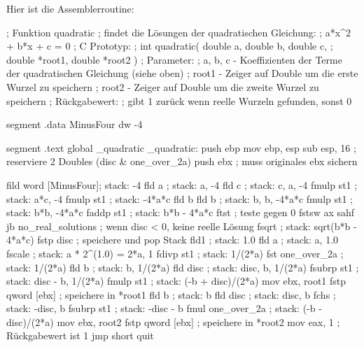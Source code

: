 Hier ist die Assemblerroutine:
\begin{AsmCodeListing}[label=quad.asm, numbers=left, commentchar=$, commandchars=\\\{\}]
 ; Funktion quadratic
 ; findet die L\"{o}sungen der quadratischen Gleichung:
 ;       a*x^2 + b*x + c = 0
 ; C Prototyp:
 ;   int quadratic( double a, double b, double c,
 ;                  double *root1, double *root2 )
 ; Parameter:
 ;   a, b, c - Koeffizienten der Terme der quadratischen Gleichung (siehe oben)
 ;   root1   - Zeiger auf Double um die erste Wurzel zu speichern
 ;   root2   - Zeiger auf Double um die zweite Wurzel zu speichern
 ; R\"{u}ckgabewert:
 ;   gibt 1 zur\"{u}ck wenn reelle Wurzeln gefunden, sonst 0


 segment .data
 MinusFour       dw      -4

 segment .text
         global  _quadratic
 _quadratic:
         push    ebp
         mov     ebp, esp
         sub     esp, 16         ; reserviere 2 Doubles (disc & one_over_2a)
         push    ebx             ; muss originales ebx sichern

         fild    word [MinusFour]; stack: -4
         fld     a               ; stack: a, -4
         fld     c               ; stack: c, a, -4
         fmulp   st1             ; stack: a*c, -4
         fmulp   st1             ; stack: -4*a*c
         fld     b
         fld     b               ; stack: b, b, -4*a*c
         fmulp   st1             ; stack: b*b, -4*a*c
         faddp   st1             ; stack: b*b - 4*a*c
         ftst                    ; teste gegen 0
         fstsw   ax
         sahf
         jb      no_real_solutions ; wenn disc < 0, keine reelle L\"{o}sung
         fsqrt                   ; stack: sqrt(b*b - 4*a*c)
         fstp    disc            ; speichere und pop Stack
         fld1                    ; stack: 1.0
         fld     a               ; stack: a, 1.0
         fscale                  ; stack: a * 2^(1.0) = 2*a, 1
         fdivp   st1             ; stack: 1/(2*a)
         fst     one_over_2a     ; stack: 1/(2*a)
         fld     b               ; stack: b, 1/(2*a)
         fld     disc            ; stack: disc, b, 1/(2*a)
         fsubrp  st1             ; stack: disc - b, 1/(2*a)
         fmulp   st1             ; stack: (-b + disc)/(2*a)
         mov     ebx, root1
         fstp    qword [ebx]     ; speichere in *root1
         fld     b               ; stack: b
         fld     disc            ; stack: disc, b
         fchs                    ; stack: -disc, b
         fsubrp  st1             ; stack: -disc - b
         fmul    one_over_2a     ; stack: (-b - disc)/(2*a)
         mov     ebx, root2
         fstp    qword [ebx]     ; speichere in *root2
         mov     eax, 1          ; R\"{u}ckgabewert ist 1
         jmp     short quit


\end{AsmCodeListing}
